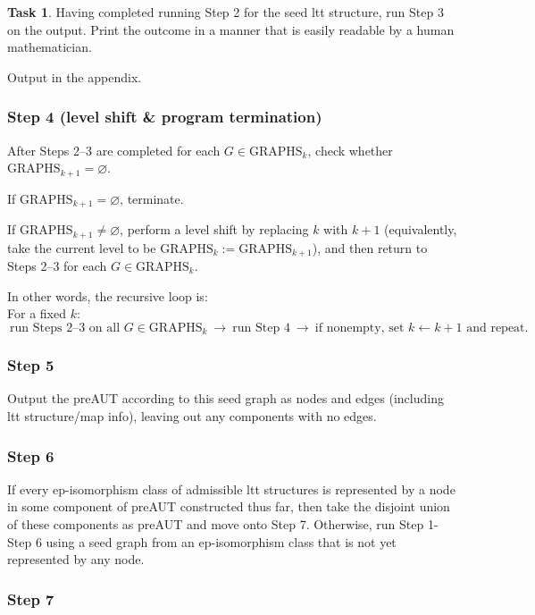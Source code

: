 \documentclass[11pt]{article}
\theoremstyle{definition}
\newtheorem{task}[thm]{Task}
\begin{document}
\begin{task}\label{t:Step3}
Having completed running Step 2 for the seed ltt structure, run Step 3 on the output. Print the outcome in a manner that is easily readable by a human mathematician.
\end{task}

Output in the appendix.


\subsubsection{Step 4 (level shift \& program termination)}

After Steps 2--3 are completed for each $G\in\mathrm{GRAPHS}_k$, check whether
$\mathrm{GRAPHS}_{k+1}=\varnothing$.

If $\mathrm{GRAPHS}_{k+1}=\varnothing$, terminate.

If $\mathrm{GRAPHS}_{k+1}\neq\varnothing$, perform a level shift by replacing
$k$ with $k+1$ (equivalently, take the current level to be
$\mathrm{GRAPHS}_{k}:=\mathrm{GRAPHS}_{k+1}$), and then return to Steps 2--3
for each $G\in\mathrm{GRAPHS}_{k}$.

In other words, the recursive loop is: \\
For a fixed $k$:
\[
\ \text{run Steps 2--3 on all }G\in\mathrm{GRAPHS}_k
\ \longrightarrow\ \text{run Step 4}
\ \longrightarrow\ \text{if nonempty, set }k\leftarrow k+1\text{ and repeat.}
\]

\subsubsection{Step 5}


Output the preAUT according to this seed graph as nodes and edges (including ltt structure/map info), leaving out any components with no edges.

\subsubsection{Step 6}

If every ep-isomorphism class of admissible ltt structures is represented by a node in some component of preAUT constructed thus far, then take the disjoint union of these components as preAUT and move onto Step 7. Otherwise, run Step 1- Step 6 using a seed graph from an ep-isomorphism class that is not yet represented by any node.

\subsubsection{Step 7}
\end{document}
